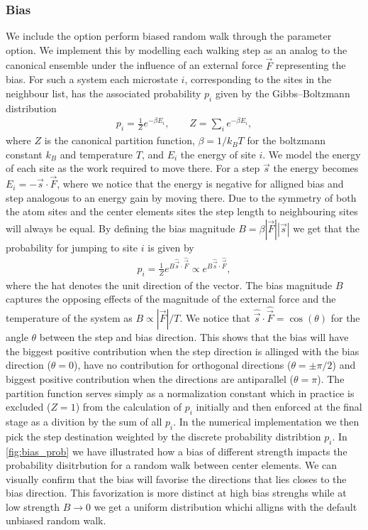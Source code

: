 
\subsubsection{Bias} %
We include the option perform biased random walk through the  parameter option. We implement this by modelling each
walking step as an analog to the canonical ensemble under the influence of an
external force $\vec{F}$ representing the bias. For such a system each
microstate $i$, corresponding to the sites in the neighbour list, has the
associated probability $p_i$ given by the Gibbs–Boltzmann distribution
\begin{align*}
  p_{i} = \frac{1}{Z}e^{-\beta E_i}, \qquad Z = \sum_i e^{-\beta E_i},
\end{align*}
where $Z$ is the canonical partition function, $\beta = 1/k_B T$ for the
boltzmann constant $k_B$ and temperature $T$, and $E_i$ the energy of site $i$.
We model the energy of each site as the work required to move there. For a step
$\vec{s}$ the energy becomes $E_i = -\vec{s}\cdot\vec{F}$, where we notice that
the energy is negative for alligned bias and step analogous to an energy gain by
moving there. Due to the symmetry of both the atom sites and the center elements
sites the step length to neighbouring sites will always be equal. By defining
the bias magnitude $B = \beta|\vec{F}||\vec{s}|$ we get that the probability for
jumping to site $i$ is given by
\begin{align*}
  p_i = \frac{1}{Z}e^{B\hat{\vec{s}}\cdot\hat{\vec{F}}} \propto e^{B\hat{\vec{s}}\cdot\hat{\vec{F}}},
\end{align*}
 where the hat denotes the unit direction of the vector. The bias magnitude $B$
 captures the opposing effects of the magnitude of the external force and the
 temperature of the system as $B\propto |\vec{F}|/T$. We notice that
 $\hat{\vec{s}}\cdot\hat{\vec{F}} = \cos{(\theta)}$ for the angle $\theta$
 between the step and bias direction. This shows that the bias will have the
 biggest positive contribution when the step direction is allinged with the bias
 direction ($\theta = 0$), have no contribution for orthogonal directions
 ($\theta = \pm \pi/2$) and biggest positive contribution when the directions
 are antiparallel ($\theta = \pi$). The partition function serves simply as a
 normalization constant which in practice is  excluded ($Z = 1$) from the
 calculation of $p_i$ initially and then enforced at the final stage as a
 divition by the sum of all $p_i$. In the numerical implementation we then pick
 the step destination weighted by the discrete probability distribtion $p_i$. In
 \cref{fig:bias_prob} we have illustrated how a bias of different strength impacts the probability disitrbution for a random walk between center elements. We can visually confirm that the bias will favorise the directions that lies closes to the bias direction. This favorization is more distinct at high bias strenghs while at low strength $B\to0$ we get a uniform distribution whichi alligns with the default unbiased random walk. 


